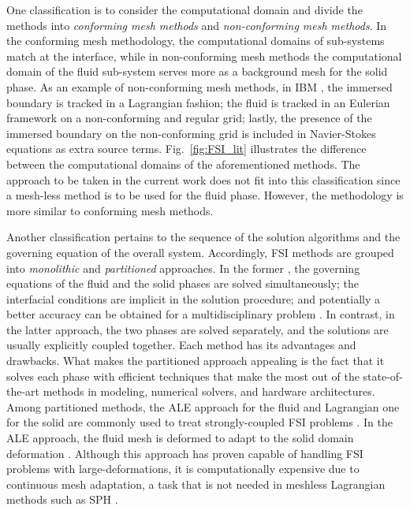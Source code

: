 One classification is to consider the computational domain and divide the methods into \textit{conforming mesh methods} and \textit{non-conforming mesh methods}. In the conforming mesh methodology, the computational domains of sub-systems match at the interface, while in non-conforming mesh methods the computational domain of the fluid sub-system serves more as a background mesh for the solid phase. As an example of non-conforming mesh methods, in IBM \cite{peskin2002,mittal2005immersed}, the immersed boundary is tracked in a Lagrangian fashion; the fluid is tracked in an Eulerian framework on a non-conforming and regular grid; lastly, the presence of the immersed boundary on the non-conforming grid is included in Navier-Stokes equations as extra source terms. Fig.~\ref{fig:FSI_lit} illustrates the difference between the computational domains of the aforementioned methods. The approach to be taken in the current work does not fit into this classification since a mesh-less method is to be used for the fluid phase. However, the methodology is more similar to conforming mesh methods.



Another classification pertains to the sequence of the solution algorithms and the governing equation of the overall system. Accordingly, FSI methods are grouped  into \textit{monolithic} and \textit{partitioned} approaches. In the former \cite{hubner2004,ryzhakov2010,michler2004}, the governing equations of the fluid and the solid phases are solved simultaneously; the interfacial conditions are implicit in the solution procedure; and potentially a better accuracy can be obtained for a multidisciplinary problem \cite{hou2012}. In contrast, in the latter approach, the two phases are solved separately, and the solutions are usually explicitly coupled together. Each method has its advantages and drawbacks. What makes the partitioned approach appealing is the fact that it solves each phase with efficient techniques that make the most out of the state-of-the-art methods in modeling, numerical solvers, and hardware architectures. Among partitioned methods, the ALE approach for the fluid and Lagrangian one for the solid are commonly used to treat strongly-coupled FSI problems \cite{hughes1981,souli2000}. In the ALE approach, the fluid mesh is deformed to adapt to the solid domain deformation \cite{fourey2010}. Although this approach has proven capable of handling  FSI problems with large-deformations, it is computationally expensive due to continuous mesh adaptation, a task that is not needed in meshless Lagrangian methods such as SPH \cite{yang2012}. 


